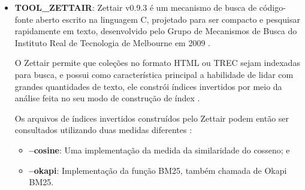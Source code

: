 \begin{itemize}
        Utiliza da linguagem de consulta AQL (\textit{ArangoDB Query Language}) para recuperar e modificar dados, que, por meio das \textit{views}
        \footnote{``Uma \textit{view} (visão) em terminologia SQL é uma única tabela que é derivada de outras tabelas [$\cdots$]  é considerada uma tabela virtual'' \cite[p.~88]{ElmasriSBD2010}.}
         do tipo arangosearch, introduz uma camada de integração com a biblioteca IResearch
        \footnote{Biblioteca de mecanismo de busca orientada a documentos, multiplataforma, e de alto desempenho, escrita inteiramente em C++, com o foco em uma conectividade de diferentes modelos de ranqueamento/similaridade \cite{IRESEARCH_GITHUB_2019}.}
        .
        Assim, por meio da AQL integrada ao IResearch, o ArangoDB fornece funções de ordenação de documentos mediante uma consulta, e, dentre elas, a função BM25() faz uma implementação do algoritmo da função de ranqueamento BM25 \cite{ARANGODB_SEARCHVIEWS_2019}.
        
        \item \textbf{TOOL\_ZETTAIR}: Zettair v0.9.3 é um mecanismo de busca de código-fonte aberto escrito na linguagem C, projetado para ser compacto e pesquisar rapidamente em texto, desenvolvido pelo Grupo de Mecanismos de Busca do Instituto Real de Tecnologia de Melbourne em 2009 \cite{ZETTAIR_HOME_2009}.

        O Zettair permite que coleções no formato HTML ou TREC sejam indexadas para busca, e possui como característica principal a habilidade de lidar com grandes quantidades de texto, ele constrói índices invertidos por meio da análise feita no seu modo de construção de índex \cite{ZETTAIR_INDEX_2009}.
        
        Os arquivos de índices invertidos construídos pelo Zettair podem então ser consultados utilizando duas medidas diferentes \cite{ZETTAIR_USAGE_2009}:
        \begin{itemize}
            \item \textbf{--cosine}: Uma implementação da medida da similaridade do cosseno; e
            
            \item \textbf{--okapi}: Implementação da função BM25, também chamada de Okapi BM25.
        \end{itemize}
    \end{itemize}

